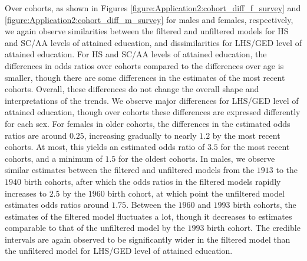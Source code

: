 \vspace{-0.2cm}
Over cohorts, as shown in Figures \ref{figure:Application2:cohort_diff_f_survey} and \ref{figure:Application2:cohort_diff_m_survey} for males and females, respectively, we again observe similarities between the filtered and unfiltered models for HS and SC/AA levels of attained education, and dissimilarities for LHS/GED level of attained education. For HS and SC/AA levels of attained education, the differences in odds ratios over cohorts compared to the differences over age is smaller, though there are some differences in the estimates of the most recent cohorts. Overall, these differences do not change the overall shape and interpretations of the trends. We observe major differences for LHS/GED level of attained education, though over cohorts these differences are expressed differently for each sex. For females in older cohorts, the differences in the estimated odds ratios are around $0.25$, increasing gradually to nearly $1.2$ by the most recent cohorts. At most, this yields an estimated odds ratio of $3.5$ for the most recent cohorts, and a minimum of $1.5$ for the oldest cohorts. In males, we observe similar estimates between the filtered and unfiltered models from the $1913$ to the $1940$ birth cohorts, after which the odds ratios in the filtered models rapidly increases to $2.5$ by the $1960$ birth cohort, at which point the unfiltered model estimates odds ratios around $1.75$. Between the $1960$ and $1993$ birth cohorts, the estimates of the filtered model fluctuates a lot, though it decreases to estimates comparable to that of the unfiltered model by the $1993$ birth cohort. The credible intervals are again observed to be significantly wider in the filtered model than the unfiltered model for LHS/GED level of attained education. 

